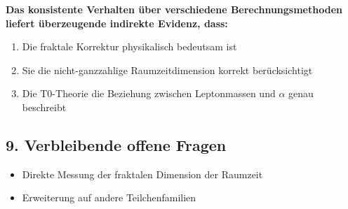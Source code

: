 \documentclass[12pt,a4paper]{article}
\begin{document}
\begin{tcolorbox}[colback=red!5!white,colframe=red!75!black]
	\textbf{Das konsistente Verhalten über verschiedene Berechnungsmethoden liefert überzeugende indirekte Evidenz, dass:}
	\begin{enumerate}
		\item Die fraktale Korrektur physikalisch bedeutsam ist
		\item Sie die nicht-ganzzahlige Raumzeitdimension korrekt berücksichtigt
		\item Die T0-Theorie die Beziehung zwischen Leptonmassen und $\alpha$ genau beschreibt
	\end{enumerate}
\end{tcolorbox}

\subsection{9. Verbleibende offene Fragen}

\begin{itemize}
	\item Direkte Messung der fraktalen Dimension der Raumzeit
	\item Erweiterung auf andere Teilchenfamilien
\end{itemize}
\end{document}
